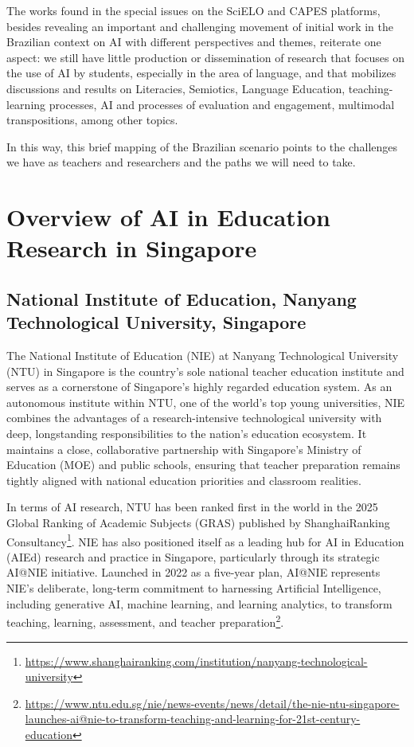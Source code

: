 \documentclass[english]{textolivre}
\begin{document}
The works found in the special issues on the SciELO and CAPES platforms, besides revealing an important and challenging movement of initial work in the Brazilian context on AI with different perspectives and themes, reiterate one aspect: we still have little production or dissemination of research that focuses on the use of AI by students, especially in the area of language, and that mobilizes discussions and results on Literacies, Semiotics, Language Education, teaching-learning processes, AI and processes of evaluation and engagement, multimodal transpositions, among other topics.

In this way, this brief mapping of the Brazilian scenario points to the challenges we have as teachers and researchers and the paths we will need to take.

\section{Overview of AI in Education Research in Singapore}\label{sec-formato}
\subsection{National Institute of Education, Nanyang Technological University, Singapore}
The National Institute of Education (NIE) at Nanyang Technological University (NTU) in Singapore is the country’s sole national teacher education institute and serves as a cornerstone of Singapore’s highly regarded education system. As an autonomous institute within NTU, one of the world’s top young universities, NIE combines the advantages of a research-intensive technological university with deep, longstanding responsibilities to the nation’s education ecosystem. It maintains a close, collaborative partnership with Singapore’s Ministry of Education (MOE) and public schools, ensuring that teacher preparation remains tightly aligned with national education priorities and classroom realities.

In terms of AI research, NTU has been ranked first in the world in the 2025 Global Ranking of Academic Subjects (GRAS) published by ShanghaiRanking Consultancy\footnote{\url{https://www.shanghairanking.com/institution/nanyang-technological-university}}. NIE has also positioned itself as a leading hub for AI in Education (AIEd) research and practice in Singapore, particularly through its strategic AI@NIE initiative. Launched in 2022 as a five-year plan, AI@NIE represents NIE’s deliberate, long-term commitment to harnessing Artificial Intelligence, including generative AI, machine learning, and learning analytics, to transform teaching, learning, assessment, and teacher preparation\footnote{\url{https://www.ntu.edu.sg/nie/news-events/news/detail/the-nie-ntu-singapore-launches-ai@nie-to-transform-teaching-and-learning-for-21st-century-education}}.
\end{document}
